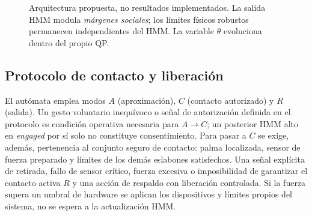 \documentclass[10pt,a4paper,twocolumn]{article}
\begin{document}
\begin{figure}[t]
\centering
{}
\caption{Arquitectura propuesta, no resultados implementados. La salida HMM modula \emph{márgenes sociales}; los límites físicos robustos permanecen independientes del HMM. La variable $\theta$ evoluciona dentro del propio QP.}
\label{fig:arch}
\end{figure}

\subsection{Protocolo de contacto y liberación}
El autómata emplea modos $A$ (aproximación), $C$ (contacto autorizado) y $R$ (salida). Un gesto voluntario inequívoco o señal de autorización definida en el protocolo es condición operativa necesaria para $A\!\to\!C$; un posterior HMM alto en \emph{engaged} por sí solo no constituye consentimiento. Para pasar a $C$ se exige, además, pertenencia al conjunto seguro de contacto: palma localizada, sensor de fuerza preparado y límites de los demás eslabones satisfechos. Una señal explícita de retirada, fallo de sensor crítico, fuerza excesiva o imposibilidad de garantizar el contacto activa $R$ y una acción de respaldo con liberación controlada. Si la fuerza supera un umbral de hardware se aplican los dispositivos y límites propios del sistema, no se espera a la actualización HMM.
\end{document}
